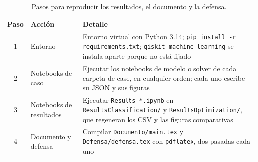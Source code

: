 \begin{table}[!htbp]
\centering
\footnotesize
\setlength{\tabcolsep}{4pt}
\renewcommand{\arraystretch}{1.15}
\begin{tabularx}{\linewidth}{@{}c >{\raggedright\arraybackslash}p{3.2cm} >{\raggedright\arraybackslash}X@{}}
\toprule
\textbf{Paso} & \textbf{Acción} & \textbf{Detalle} \\
\midrule
1 & Entorno & Entorno virtual con Python 3.14; \texttt{pip install -r requirements.txt}; \texttt{qiskit-machine-learning} se instala aparte porque no está fijado \\
2 & Notebooks de caso & Ejecutar los notebooks de modelo o solver de cada carpeta de caso, en cualquier orden; cada uno escribe su JSON y sus figuras \\
3 & Notebooks de resultados & Ejecutar \texttt{Results\_*.ipynb} en \texttt{ResultsClassification/} y \texttt{ResultsOptimization/}, que regeneran los CSV y las figuras comparativas \\
4 & Documento y defensa & Compilar \texttt{Documento/main.tex} y \texttt{Defensa/defensa.tex} con \texttt{pdflatex}, dos pasadas cada uno \\
\bottomrule
\end{tabularx}
\caption{Pasos para reproducir los resultados, el documento y la defensa.}
\label{tab:reproduccion}
\end{table}
